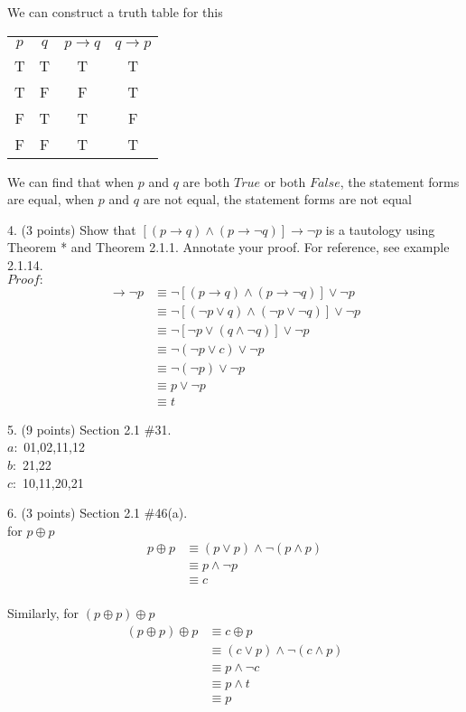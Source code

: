 \documentclass{article}
\begin{document}
We can construct a truth table for this
\begin{center}
    \begin{tabular}{c|c|c|c}
        $p$ & $q$ & $p \rightarrow q$ & $q \rightarrow p$  \\
         T & T & T & T \\
         T & F & F & T \\
         F & T & T & F \\
         F & F & T & T
    \end{tabular}
\end{center}
We can find that when $p$ and $q$ are both $True$ or both $False$, the statement forms are equal, when $p$ and $q$ are not equal, the statement forms are not equal
 
4. (3 points) Show that $[(p \rightarrow q) \wedge(p \rightarrow \neg q)] \rightarrow \neg p$ is a tautology using Theorem * and Theorem 2.1.1. Annotate your proof. For reference, see example 2.1.14.\\
$Proof:$
\begin{align}
    [(p \rightarrow q) \wedge (p \rightarrow \neg q)] \rightarrow \neg p &\equiv 
    \neg [(p \rightarrow q) \wedge (p \rightarrow \neg q)] \vee \neg p \tag{by Theorem *}\\
    &\equiv \neg[(\neg p \vee q) \wedge (\neg p \vee \neg q)] \vee \neg p \tag{by Theorem *}\\
    &\equiv \neg[\neg p \vee (q \wedge \neg q)]\vee \neg p \tag{by Distributive Law}\\
    &\equiv \neg(\neg p \vee c) \vee \neg p \tag{by Negation Law}\\
    &\equiv \neg(\neg p) \vee \neg p \tag{by Identity Law}\\
    &\equiv p \vee \neg p \tag{by Double Negative Law}\\
    &\equiv t \tag{by Negation Law}  
\end{align}


5. (9 points) Section 2.1 \#31.\\
$a: $ {01,02,11,12}\\
$b: $ {21,22}\\
$c: $ {10,11,20,21}

6. (3 points) Section 2.1 \#46(a).\\
for $p \oplus p$
\begin{align}
    p \oplus p &\equiv (p \vee p) \wedge \neg (p \wedge p)\\
    &\equiv p \wedge\neg p\\
    &\equiv c
\end{align}
\\Similarly, for $(p \oplus p) \oplus p$\\
\begin{align}
    (p \oplus p) \oplus p &\equiv c \oplus p\\
    &\equiv (c \vee p) \wedge \neg (c \wedge p)\\
    &\equiv p \wedge \neg c\\
    &\equiv p \wedge t\\
    &\equiv p
\end{align}
\end{document}
